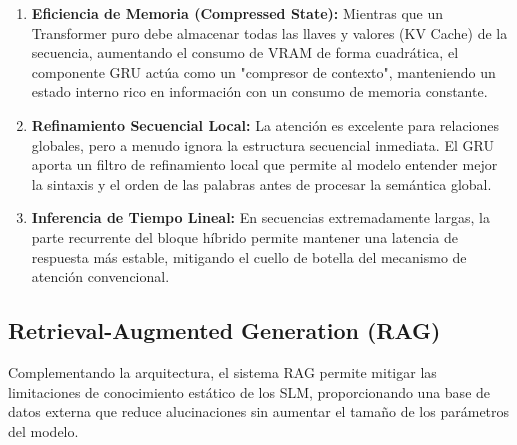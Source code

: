 \begin{enumerate}
    \item \textbf{Eficiencia de Memoria (Compressed State):} Mientras que un Transformer puro debe almacenar todas las llaves y valores (KV Cache) de la secuencia, aumentando el consumo de VRAM de forma cuadrática, el componente GRU actúa como un "compresor de contexto", manteniendo un estado interno rico en información con un consumo de memoria constante.
    \item \textbf{Refinamiento Secuencial Local:} La atención es excelente para relaciones globales, pero a menudo ignora la estructura secuencial inmediata. El GRU aporta un filtro de refinamiento local que permite al modelo entender mejor la sintaxis y el orden de las palabras antes de procesar la semántica global.
    \item \textbf{Inferencia de Tiempo Lineal:} En secuencias extremadamente largas, la parte recurrente del bloque híbrido permite mantener una latencia de respuesta más estable, mitigando el cuello de botella del mecanismo de atención convencional.
\end{enumerate}

\subsection{Retrieval-Augmented Generation (RAG)}
Complementando la arquitectura, el sistema RAG permite mitigar las limitaciones de conocimiento estático de los SLM, proporcionando una base de datos externa que reduce alucinaciones sin aumentar el tamaño de los parámetros del modelo.
